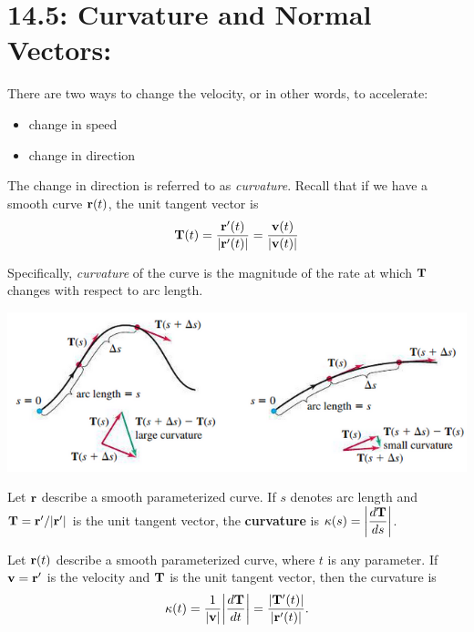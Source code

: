 \documentclass[../mathNotesPreamble]{subfiles}
\begin{document}
\section{14.5: Curvature and Normal Vectors:}

  There are two ways to change the velocity, or in other words, to accelerate:
  \begin{itemize}
    \item 
      change in speed
    \item 
      change in direction 
  \end{itemize}
  The change in direction is referred to as \textit{curvature}. Recall that if we have a smooth curve ${\mathbf{r}}(t)$, the unit tangent vector is
    \[{\mathbf{T}}(t)=\frac{{\mathbf{r}}'(t)}{{\left\vert{\mathbf{r}}'(t)\right\vert}}=\frac{{\mathbf{v}}(t)}{{\left\vert{\mathbf{v}}(t)\right\vert}}\]

  Specifically, \textit{curvature} of the curve is the magnitude of the rate at which ${\mathbf{T}}$ changes with respect to arc length.

  \begin{center}
    \includegraphics[width=0.8\linewidth]{../images/briggs_14_05/fig14_29}
  \end{center}

  \begin{defn*}[Curvature]
    Let ${\mathbf{r}}$ describe a smooth parameterized curve. If $s$ denotes arc length and ${\mathbf{T}}={\mathbf{r}}'/{\left\vert{\mathbf{r}}'\right\vert}$ is the unit tangent vector, the \textbf{curvature} is $\displaystyle\kappa(s)={\left\vert\frac{d{\mathbf{T}}}{ds}\right\vert}$.
  \end{defn*}
  \pagebreak

  \begin{thmBox*}
    Let ${\mathbf{r}}(t)$ describe a smooth parameterized curve, where $t$ is any parameter. If ${\mathbf{v}}={\mathbf{r}}'$ is the velocity and ${\mathbf{T}}$ is the unit tangent vector, then the curvature is
      \[\kappa(t)=\frac{1}{{\left\vert{\mathbf{v}}\right\vert}}{\left\vert\frac{d{\mathbf{T}}}{dt}\right\vert}=\frac{{\left\vert{\mathbf{T}}'(t)\right\vert}}{{\left\vert{\mathbf{r}}'(t)\right\vert}}.\]
  \end{thmBox*}
\end{document}
